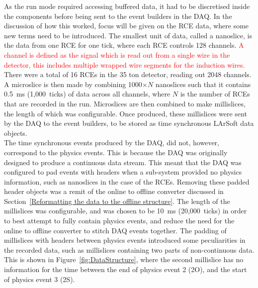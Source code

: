 As the run mode required accessing buffered data, it had to be discretised inside the components before being sent to the event builders in the DAQ. In the discussion of how this worked, focus will be given on the RCE data, where some new terms need to be introduced. The smallest unit of data, called a nanoslice, is the data from one RCE for one tick, where each RCE controls 128 channels. \textcolor{red}{A channel is defined as the signal which is read out from a single wire in the detector, this includes multiple wrapped wire segments for the induction wires.} There were a total of 16 RCEs in the 35 ton detector, reading out 2048 channels. A microslice is then made by combining 1000$\times N$ nanoslices such that it contains 0.5~ms (1,000~ticks) of data across all channels, where $N$ is the number of RCEs that are recorded in the run. Microslices are then combined to make millislices, the length of which was configurable. Once produced, these millislices were sent by the DAQ to the event builders, to be stored as time synchronous LArSoft data objects. \\

The time synchronous events produced by the DAQ, did not, however, correspond to the physics events. This is because the DAQ was originally designed to produce a continuous data stream. This meant that the DAQ was configured to pad events with headers when a sub-system provided no physics information, such as nanoslices in the case of the RCEs. Removing these padded header objects was a remit of the online to offline converter discussed in Section~\ref{Reformatting the data to the offline structure}. The length of the millislices was configurable, and was chosen to be 10~ms (20,000~ticks) in order to best attempt to fully contain physics events, and reduce the need for the online to offline converter to stitch DAQ events together. The padding of millislices with headers between physics events introduced some peculiarities in the recorded data, such as millislices containing two parts of non-continuous data. This is shown in Figure~\ref{fig:DataStructure}, where the second millislice has no information for the time between the end of physics event 2 (2O), and the start of physics event 3 (2S).\\

